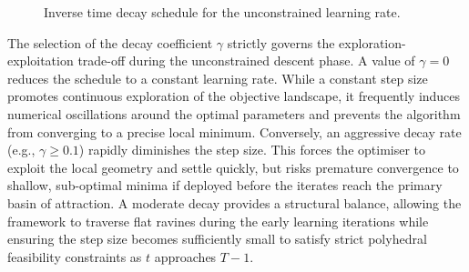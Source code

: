 \begin{figure}[htpb]
    \centering
    \caption{Inverse time decay schedule for the unconstrained learning rate.}
    \label{fig:learning_rate_decay}
\end{figure}
The selection of the decay coefficient $\gamma$ strictly governs the exploration-exploitation trade-off during the unconstrained descent phase. A value of $\gamma = 0$ reduces the schedule to a constant learning rate. While a constant step size promotes continuous exploration of the objective landscape, it frequently induces numerical oscillations around the optimal parameters and prevents the algorithm from converging to a precise local minimum. Conversely, an aggressive decay rate (e.g., $\gamma \ge 0.1$) rapidly diminishes the step size. This forces the optimiser to exploit the local geometry and settle quickly, but risks premature convergence to shallow, sub-optimal minima if deployed before the iterates reach the primary basin of attraction. A moderate decay provides a structural balance, allowing the framework to traverse flat ravines during the early learning iterations while ensuring the step size becomes sufficiently small to satisfy strict polyhedral feasibility constraints as $t$ approaches $T-1$.

